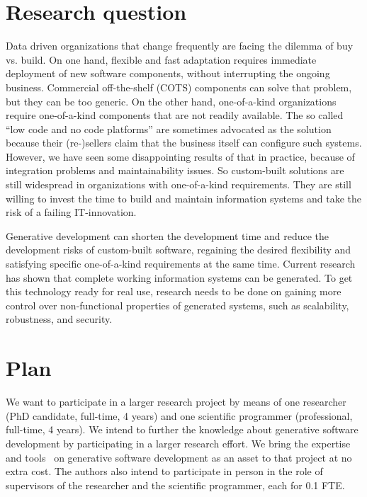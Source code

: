 \documentclass{elsarticle}
\begin{document}
\section{Research question}
\label{sct:Research question}
   Data driven organizations that change frequently are facing the dilemma of buy vs. build.
   On one hand, flexible and fast adaptation requires immediate deployment of new software components, without interrupting the ongoing business.
   Commercial off-the-shelf (COTS) components can solve that problem, but they can be too generic.
   On the other hand, one-of-a-kind organizations require one-of-a-kind components that are not readily available.
   The so called ``low code and no code platforms'' are sometimes advocated as the solution
   because their (re-)sellers claim that the business itself can configure such systems.
   However, we have seen some disappointing results of that in practice, because of integration problems and maintainability issues.
   So custom-built solutions are still widespread in organizations with one-of-a-kind requirements.
   They are still willing to invest the time to build and maintain information systems and take the risk of a failing IT-innovation.
 
   Generative development can shorten the development time and reduce the development risks of custom-built software,
   regaining the desired flexibility and satisfying specific one-of-a-kind requirements at the same time.
   Current research has shown that complete working information systems can be generated.
   To get this technology ready for real use, research needs to be done on gaining more control over non-functional properties of generated systems,
   such as scalability, robustness, and security.

\section{Plan}
   We want to participate in a larger research project by means of one researcher (PhD candidate, full-time, 4 years) and one scientific programmer (professional, full-time, 4 years).
   We intend to further the knowledge about generative software development by participating in a larger research effort.
   We bring the expertise~\cite{JoostenRAMiCS2017,Steenvoorden2022} and tools~\cite{Joosten-JLAMP2018,10.1145/3354166.3354182} on generative software development
   as an asset to that project at no extra cost.
   The authors also intend to participate in person in the role of supervisors of the researcher and the scientific programmer, each for 0.1 FTE.
\end{document}
